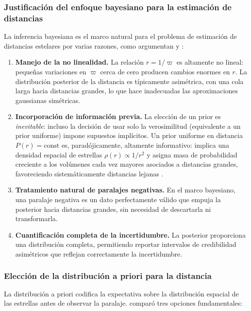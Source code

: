 \documentclass[stu, 12pt, letterpaper, donotrepeattitle, floatsintext, natbib]{apa7_ula}
\begin{document}
\subsubsection{Justificación del enfoque bayesiano para la estimación
de distancias}
La inferencia bayesiana es el marco natural para el problema de
estimación de distancias estelares por varias razones, como
argumentan \citet{Bailer_2015} y \citet{luri2018gaia}:

\begin{enumerate}
    \item \textbf{Manejo de la no linealidad.} La relación
    $r = 1/\varpi$ es altamente no lineal: pequeñas variaciones en
    $\varpi$ cerca de cero producen cambios enormes en $r$. La
    distribución posterior de la distancia es típicamente asimétrica,
    con una cola larga hacia distancias grandes, lo que hace
    inadecuadas las aproximaciones gaussianas simétricas.
    \item \textbf{Incorporación de información previa.} La elección
    de un prior es \textit{inevitable}: incluso la decisión de usar
    solo la verosimilitud (equivalente a un prior uniforme) impone
    supuestos implícitos. Un prior uniforme en distancia
    $P(r) = \text{const}$ es, paradójicamente, altamente informativo:
    implica una densidad espacial de estrellas $\rho(r) \propto 1/r^2$
    y asigna masa de probabilidad creciente a los volúmenes cada vez
    mayores asociados a distancias grandes, favoreciendo
    sistemáticamente distancias lejanas \citep{Bailer_2015}.
    \item \textbf{Tratamiento natural de paralajes negativas.} En
    el marco bayesiano, una paralaje negativa es un dato perfectamente
    válido que empuja la posterior hacia distancias grandes, sin
    necesidad de descartarla ni transformarla.
    \item \textbf{Cuantificación completa de la incertidumbre.} La
    posterior proporciona una distribución completa, permitiendo
    reportar intervalos de credibilidad asimétricos que reflejan
    correctamente la incertidumbre.
\end{enumerate}

\subsubsection{Elección de la distribución a priori para la distancia}
La distribución a priori codifica la expectativa sobre la
distribución espacial de las estrellas antes de observar la paralaje.
\citet{Bailer_2015} comparó tres opciones fundamentales:
\end{document}
